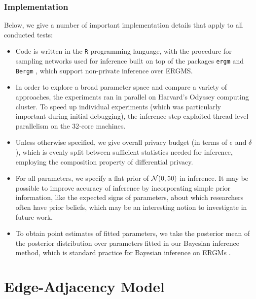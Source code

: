   
\subsubsection*{Implementation}

Below, we give a number of important implementation details that apply to all conducted tests:
\begin{itemize}
	\item Code is written in the \texttt{R} programming language, with the procedure for sampling networks used for inference built on top of the packages \texttt{ergm} \cite{ergm} and \texttt{Bergm} \cite{Bergm}, which support non-private inference over ERGMS.
	\item In order to explore a broad parameter space and compare a variety of approaches, the experiments ran in parallel on Harvard's Odyssey computing cluster. To speed up individual experiments (which was particularly important during initial debugging), the  inference step exploited thread level parallelism  on the 32-core machines.
	\item Unless otherwise specified, we give overall privacy budget (in terms of $\epsilon$ and $\delta$), which is evenly split between sufficient statistics needed for inference, employing the composition property of differential privacy.
	\item For all parameters, we specify a flat prior of $\mathcal{N}(0, 50)$ in inference. It may be possible to improve accuracy of inference by incorporating simple prior information, like the expected signs of parameters, about which researchers often have prior beliefs, which may be an interesting notion to investigate in future work.
	\item To obtain point estimates of fitted parameters, we take the posterior mean of the posterior distribution over parameters fitted in our Bayesian inference method, which is standard practice for Bayesian inference on ERGMs \cite{CF11}.
\end{itemize}
 
 \section{Edge-Adjacency Model}
 
